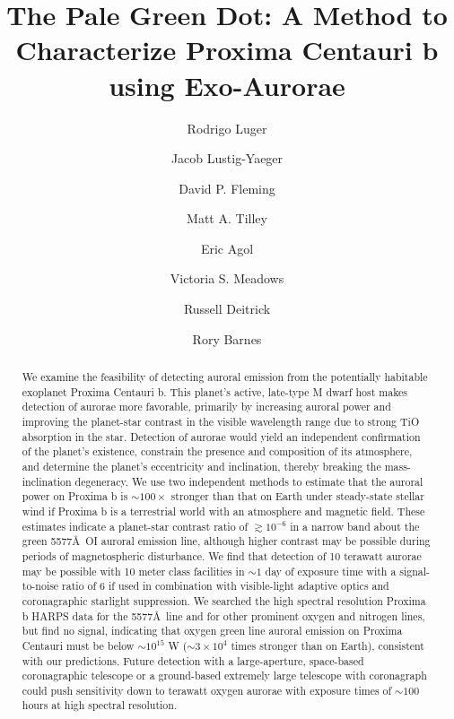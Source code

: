\documentclass[apjl]{emulateapj}
\begin{document}
\title{The Pale Green Dot: A Method to Characterize Proxima Centauri \MakeLowercase{b} using Exo-Aurorae}

\author{Rodrigo Luger}
\author{Jacob Lustig-Yaeger}
\author{David P. Fleming}
\author{Matt A. Tilley}
\author{Eric Agol}
\author{Victoria S. Meadows}
\author{Russell Deitrick}
\author{Rory Barnes}





\begin{abstract}
We examine the feasibility of detecting auroral emission from the potentially habitable exoplanet Proxima Centauri b. This planet's active, late-type M dwarf host makes detection of aurorae more favorable, primarily by increasing auroral power and improving the planet-star contrast in the visible wavelength range due to strong TiO absorption in the star. Detection of aurorae would yield an independent confirmation of the planet's existence, constrain the presence and composition of its atmosphere, and determine the planet's eccentricity and inclination, thereby breaking the mass-inclination degeneracy. We use two independent methods to estimate that the auroral power on Proxima b is ${\sim} 100 {\times}$ stronger than that on Earth under steady-state stellar wind if Proxima b is a terrestrial world with an atmosphere and magnetic field. These estimates indicate a planet-star contrast ratio of $\gtrsim 10^{-6}$ in a narrow band about the green 5577\AA\ OI auroral emission line, although higher contrast may be possible during periods of magnetospheric disturbance. We find that detection of 10 terawatt aurorae may be possible with 10 meter class facilities in ${\sim} 1$ day of exposure time with a signal-to-noise ratio of 6 if used in combination with visible-light adaptive optics and coronagraphic starlight suppression. We searched the high spectral resolution Proxima b HARPS data for the 5577\AA\ line and for other prominent oxygen and nitrogen lines, but find no signal, indicating that oxygen green line auroral emission on Proxima Centauri must be below ${\sim} 10^{15}$ W (${\sim} 3\times 10^4$ times stronger than on Earth), consistent with our predictions.  Future detection with a large-aperture, space-based coronagraphic telescope or a ground-based extremely large telescope with coronagraph could push sensitivity down to terawatt oxygen aurorae with exposure times of ${\sim} 100$ hours at high spectral resolution. 
\end{abstract}
\end{document}
